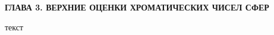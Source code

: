 \newpage
\begin{center}
\noindent\textbf{ГЛАВА 3. ВЕРХНИЕ ОЦЕНКИ ХРОМАТИЧЕСКИХ ЧИСЕЛ СФЕР}\label{chapters:3}
\vspace{1.5mm}
\end{center}

текст